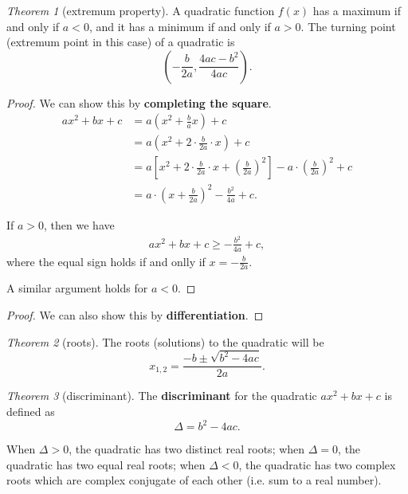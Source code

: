 \documentclass[8pt]{article}
\theoremstyle{remark}
\newtheorem{theorem}{Theorem}[section]
\begin{document}
        \begin{theorem}[extremum property]
            A quadratic function $f(x)$ has a maximum if and only if $a < 0$, and it has a minimum if and only if $a > 0$. The turning point (extremum point in this case) of a quadratic is
            $$
                \left(-\frac{b}{2a}, \frac{4ac - b^2}{4ac}\right).
            $$

            \begin{proof}
                We can show this by \textbf{completing the square}.
                \begin{align*}
                    ax^2 + bx + c &= a \left(x^2 + \frac{b}{a} x\right) + c\\
                    &= a \left(x^2 + 2 \cdot \frac{b}{2a} \cdot x \right) + c\\
                    &= a \left[x^2 + 2 \cdot \frac{b}{2a} \cdot x + \left(\frac{b}{2a}\right)^2\right] - a \cdot \left(\frac{b}{2a}\right)^2 + c\\
                    &= a \cdot \left(x + \frac{b}{2a}\right)^2 - \frac{b^2}{4a} + c.
                \end{align*}

                If $a > 0$, then we have
                \begin{align*}
                    ax^2 + bx + c \geq -\frac{b^2}{4a} + c,
                \end{align*}
                where the equal sign holds if and onlly if $x = - \frac{b}{2a}$.

                A similar argument holds for $a < 0$.
            \end{proof}

            \begin{proof}
                We can also show this by \textbf{differentiation}.
            \end{proof}
        \end{theorem}

        \begin{theorem}[roots]
            The roots (solutions) to the quadratic will be
            $$
                x_{1, 2} = \frac{-b \pm \sqrt{b^2 - 4ac}}{2a}.
            $$
        \end{theorem}

        \begin{theorem}[discriminant]
            The \textbf{discriminant} for the quadratic $ax^2 + bx + c$ is defined as
            $$
                \Delta = b^2 - 4ac.
            $$

            When $\Delta > 0$, the quadratic has two distinct real roots; when $\Delta = 0$, the quadratic has two equal real roots; when $\Delta < 0$, the quadratic has two complex roots which are complex conjugate of each other (i.e. sum to a real number).
        \end{theorem}
\end{document}
